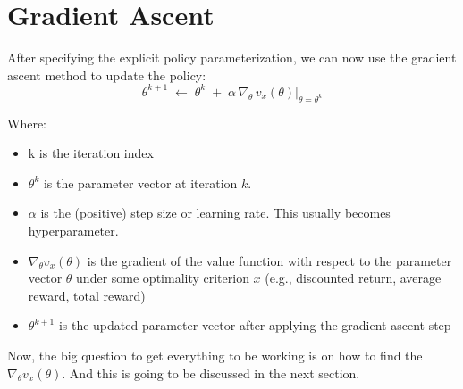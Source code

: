 \section{Gradient Ascent}
\label{sec:gradient_ascent}

After specifying the explicit policy parameterization, we can now use the gradient ascent method to update the policy:
\begin{equation}
    \theta^{k+1} \;\leftarrow\; \theta^k \;+\; \alpha \,\nabla_\theta \,v_x(\theta)\big|_{\theta=\theta^k}
\end{equation}

Where:
\begin{itemize}
    \item k is the iteration index
    \item $\theta^k$ is the parameter vector at iteration $k$.
    \item $\alpha$ is the (positive) step size or learning rate. This usually becomes hyperparameter.
    \item $\nabla_\theta v_x(\theta)$ is the gradient of the value function with respect to the parameter vector $\theta$ under some optimality criterion $x$ (e.g., discounted return, average reward, total reward)
    \item $\theta^{k+1}$ is the updated parameter vector after applying the gradient ascent step
\end{itemize}

Now, the big question to get everything to be working is on how to find the $\nabla_\theta v_x(\theta)$. And this is going to be discussed in the next section.


